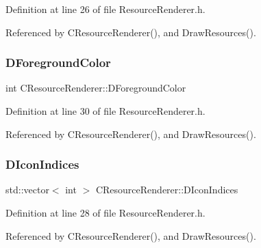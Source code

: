 Definition at line 26 of file Resource\+Renderer.\+h.



Referenced by C\+Resource\+Renderer(), and Draw\+Resources().

\hypertarget{classCResourceRenderer_a8605027f29776f3042e1c3f9072d4390}{}\label{classCResourceRenderer_a8605027f29776f3042e1c3f9072d4390} 
\subsubsection{\texorpdfstring{D\+Foreground\+Color}{DForegroundColor}}
{\footnotesize\ttfamily int C\+Resource\+Renderer\+::\+D\+Foreground\+Color\hspace{0.3cm}{\ttfamily [protected]}}



Definition at line 30 of file Resource\+Renderer.\+h.



Referenced by C\+Resource\+Renderer(), and Draw\+Resources().

\hypertarget{classCResourceRenderer_a18c32c2685ee404dc0177b977fb2da59}{}\label{classCResourceRenderer_a18c32c2685ee404dc0177b977fb2da59} 
\subsubsection{\texorpdfstring{D\+Icon\+Indices}{DIconIndices}}
{\footnotesize\ttfamily std\+::vector$<$ int $>$ C\+Resource\+Renderer\+::\+D\+Icon\+Indices\hspace{0.3cm}{\ttfamily [protected]}}



Definition at line 28 of file Resource\+Renderer.\+h.



Referenced by C\+Resource\+Renderer(), and Draw\+Resources().

\hypertarget{classCResourceRenderer_a6a4bc80e88c35798259d3235785a1a5f}{}\label{classCResourceRenderer_a6a4bc80e88c35798259d3235785a1a5f} 
